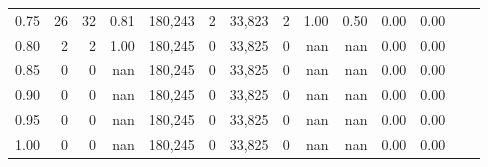 \begin{tabular}{rrrrrrrrrrrrrr}
0.75 &      26 &     32 &    0.81 &  180,243 &        2 &  33,823 &       2 &  1.00 &  0.50 &  0.00 &      0.00 \\
0.80 &       2 &      2 &    1.00 &  180,245 &        0 &  33,825 &       0 &   nan &   nan &  0.00 &      0.00 \\
0.85 &       0 &      0 &     nan &  180,245 &        0 &  33,825 &       0 &   nan &   nan &  0.00 &      0.00 \\
0.90 &       0 &      0 &     nan &  180,245 &        0 &  33,825 &       0 &   nan &   nan &  0.00 &      0.00 \\
0.95 &       0 &      0 &     nan &  180,245 &        0 &  33,825 &       0 &   nan &   nan &  0.00 &      0.00 \\
1.00 &       0 &      0 &     nan &  180,245 &        0 &  33,825 &       0 &   nan &   nan &  0.00 &      0.00 \\
\bottomrule
\end{tabular}
